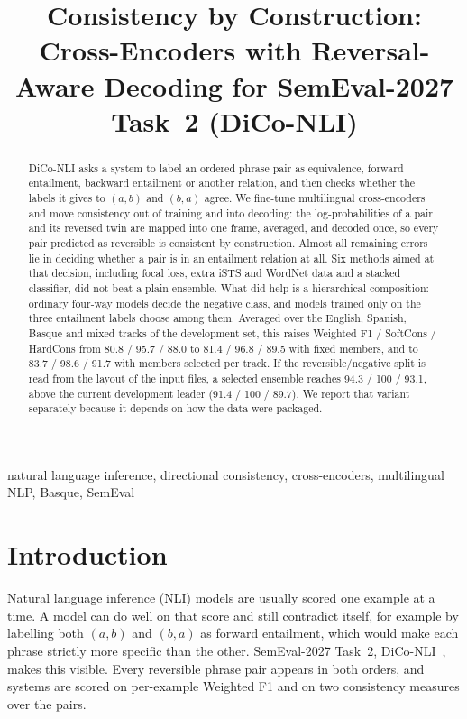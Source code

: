 \documentclass[conference]{IEEEtran}
\begin{document}
\title{Consistency by Construction: Cross-Encoders with Reversal-Aware Decoding
for SemEval-2027 Task~2 (DiCo-NLI)}

\author{
}

\maketitle

\begin{abstract}
DiCo-NLI asks a system to label an ordered phrase pair as equivalence, forward
entailment, backward entailment or another relation, and then checks whether
the labels it gives to $(a,b)$ and $(b,a)$ agree. We fine-tune multilingual
cross-encoders and move consistency out of training and into decoding: the
log-probabilities of a pair and its reversed twin are mapped into one frame,
averaged, and decoded once, so every pair predicted as reversible is
consistent by construction. Almost all remaining errors lie in deciding whether
a pair is in an entailment relation at all. Six methods aimed at that decision,
including focal loss, extra iSTS and WordNet data and a stacked classifier,
did not beat a plain ensemble. What did help is a hierarchical composition:
ordinary four-way models decide the negative class, and models trained only on
the three entailment labels choose among them. Averaged over the English,
Spanish, Basque and mixed tracks of the development set, this raises Weighted
F1 / SoftCons / HardCons from 80.8 / 95.7 / 88.0 to 81.4 / 96.8 / 89.5 with fixed
members, and to 83.7 / 98.6 / 91.7 with members selected per track. If the
reversible/negative split is read from the layout of the input files, a
selected ensemble reaches 94.3 / 100 / 93.1, above the current development
leader (91.4 / 100 / 89.7). We report that variant separately because it
depends on how the data were packaged.
\end{abstract}

\begin{IEEEkeywords}
natural language inference, directional consistency, cross-encoders,
multilingual NLP, Basque, SemEval
\end{IEEEkeywords}

\section{Introduction}

Natural language inference (NLI) models are usually scored one example at a
time. A model can do well on that score and still contradict itself, for
example by labelling both $(a,b)$ and $(b,a)$ as forward entailment, which
would make each phrase strictly more specific than the other. SemEval-2027 Task~2, DiCo-NLI~\cite{dicoNLIsite,dicoNLIrepo}, makes
this visible. Every reversible phrase pair appears in both orders, and systems
are scored on per-example Weighted F1 and on two consistency measures over the
pairs.
\end{document}
